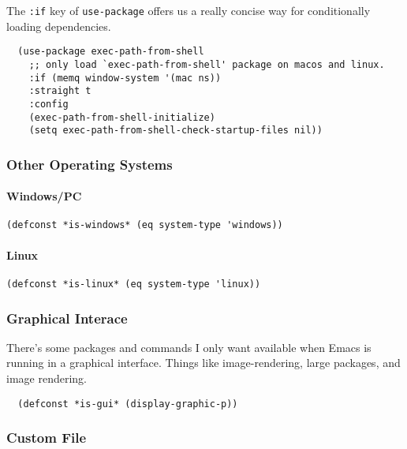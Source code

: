 \documentclass[11pt]{article}
\begin{document}
The \texttt{:if} key of \texttt{use-package} offers us a really concise way for
conditionally loading dependencies.

\begin{verbatim}
  (use-package exec-path-from-shell
    ;; only load `exec-path-from-shell' package on macos and linux.
    :if (memq window-system '(mac ns))
    :straight t
    :config
    (exec-path-from-shell-initialize)
    (setq exec-path-from-shell-check-startup-files nil))
\end{verbatim}

\subsubsection*{Other Operating Systems}
\label{sec:org721816e}
\paragraph*{Windows/PC}
\label{sec:org29ce3ee}

\begin{verbatim}
(defconst *is-windows* (eq system-type 'windows))
\end{verbatim}

\paragraph*{Linux}
\label{sec:orgff1a639}

\begin{verbatim}
(defconst *is-linux* (eq system-type 'linux))
\end{verbatim}

\subsubsection*{Graphical Interace}
\label{sec:org56a0112}

There's some packages and commands I only want available when Emacs is
running in a graphical interface. Things like image-rendering, large
packages, and image rendering.

\begin{verbatim}
  (defconst *is-gui* (display-graphic-p))
\end{verbatim}

\subsubsection*{Custom File}
\label{sec:org90421c4}
\end{document}
